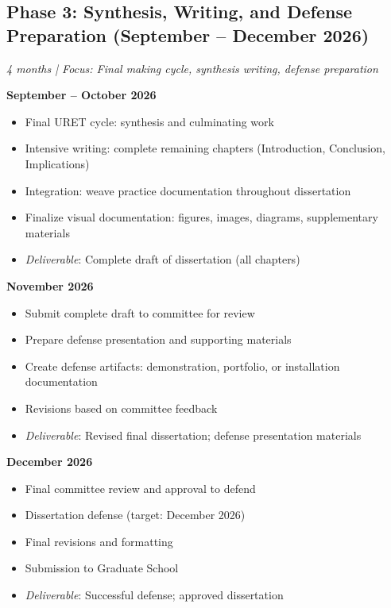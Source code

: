 \subsection*{Phase 3: Synthesis, Writing, and Defense Preparation (September – December 2026)}
\textit{4 months | Focus: Final making cycle, synthesis writing, defense preparation}

\textbf{September – October 2026}
\begin{itemize}[noitemsep]
	\item Final URET cycle: synthesis and culminating work
	\item Intensive writing: complete remaining chapters (Introduction, Conclusion, Implications)
	\item Integration: weave practice documentation throughout dissertation
	\item Finalize visual documentation: figures, images, diagrams, supplementary materials
	\item \textit{Deliverable}: Complete draft of dissertation (all chapters)
\end{itemize}

\textbf{November 2026}
\begin{itemize}[noitemsep]
	\item Submit complete draft to committee for review
	\item Prepare defense presentation and supporting materials
	\item Create defense artifacts: demonstration, portfolio, or installation documentation
	\item Revisions based on committee feedback
	\item \textit{Deliverable}: Revised final dissertation; defense presentation materials
\end{itemize}

\textbf{December 2026}
\begin{itemize}[noitemsep]
	\item Final committee review and approval to defend
	\item Dissertation defense (target: December 2026)
	\item Final revisions and formatting
	\item Submission to Graduate School
	\item \textit{Deliverable}: Successful defense; approved dissertation
\end{itemize}

